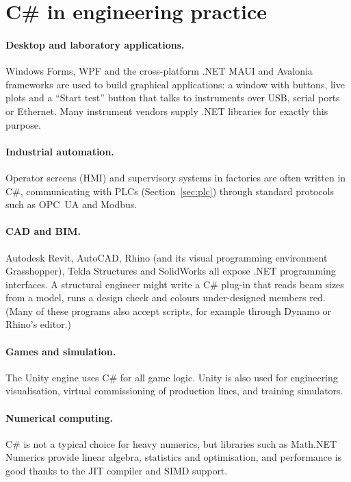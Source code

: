 \section{C\# in engineering practice}

\paragraph{Desktop and laboratory applications.}
Windows Forms, WPF and the cross-platform .NET MAUI and Avalonia frameworks are used to
build graphical applications: a window with buttons, live plots and a ``Start test''
button that talks to instruments over USB, serial ports or Ethernet. Many instrument
vendors supply .NET libraries for exactly this purpose.

\paragraph{Industrial automation.}
Operator screens (HMI) and supervisory systems in factories are often written in C\#,
communicating with PLCs (Section~\ref{sec:plc}) through standard protocols such as OPC~UA
and Modbus.

\paragraph{CAD and BIM.}
Autodesk Revit, AutoCAD, Rhino (and its visual programming environment Grasshopper), Tekla
Structures and SolidWorks all expose .NET programming interfaces. A structural engineer
might write a C\# plug-in that reads beam sizes from a model, runs a design check and
colours under-designed members red. (Many of these programs also accept \py scripts, for
example through Dynamo or Rhino's \py editor.)

\paragraph{Games and simulation.}
The Unity engine uses C\# for all game logic. Unity is also used for engineering
visualisation, virtual commissioning of production lines, and training simulators.

\paragraph{Numerical computing.}
C\# is not a typical choice for heavy numerics, but libraries such as Math.NET Numerics
provide linear algebra, statistics and optimisation, and performance is good thanks to the
JIT compiler and SIMD support.

